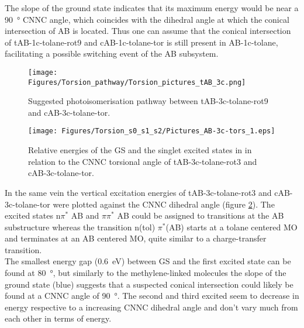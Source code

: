 The slope of the ground state indicates that its maximum energy would be near a \SI{90}{\degree} CNNC angle, which coincides with the dihedral angle at which the conical intersection of AB is located.\cite{maximum-con-inter-AB} 
Thus one can assume that the conical intersection of tAB-1c-tolane-rot9 and cAB-1c-tolane-tor is still present in AB-1c-tolane, facilitating a possible switching event of the AB subsystem.
%
%
%
%
\begin{figure}[H]
    \centering
    \texttt{[image: Figures/Torsion\_pathway/Torsion\_pictures\_tAB\_3c.png]}
    \caption{Suggested photoisomerisation pathway between tAB-3c-tolane-rot9 and cAB-3c-tolane-tor.}
    \label{fig:tors_tAB-cAB-3c-pathway}
\end{figure}
%
%
\begin{figure}[H]
    \centering
    \texttt{[image: Figures/Torsion\_s0\_s1\_s2/Pictures\_AB-3c-tors\_1.eps]}
    \caption{Relative energies of the GS and the singlet excited states in in relation to the CNNC torsional angle of tAB-3c-tolane-rot3 and cAB-3c-tolane-tor.}
    \label{fig:tors-tAB-cAB-3c}
\end{figure}
%
In the same vein the vertical excitation energies of tAB-3c-tolane-rot3 and cAB-3c-tolane-tor were plotted against the CNNC dihedral angle (figure \ref{fig:tors-tAB-cAB-3c}). 
The excited states n$\pi^{*}$ AB and $\pi\pi^{*}$ AB could be assigned to transitions at the AB substructure whereas the transition n(tol) $\pi^{*}$(AB) starts at a tolane centered MO and terminates at an AB centered MO, quite similar to a charge-transfer transition. \\
The smallest energy gap (\SI{0.6}{\eV}) between GS and the first excited state can be found at \SI{80}{\degree}, but similarly to the methylene-linked molecules the slope of the ground state (blue) suggests that a suspected conical intersection could likely be found at a CNNC angle of \SI{90}{\degree}. 
The second and third excited seem to decrease in energy respective to a increasing CNNC dihedral angle and don't vary much from each other in terms of energy.


